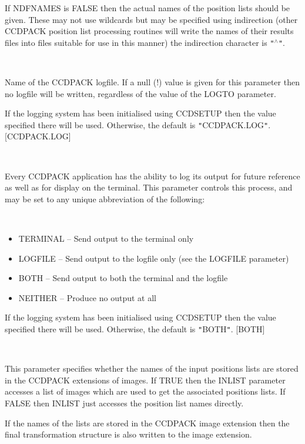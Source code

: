 \documentclass[twoside,11pt]{article}
\newcommand{\htmlref}[2]{#1}
\renewcommand{\_}{\texttt{\symbol{95}}}
\newcommand{\qt}[1]{{\tt "}#1{\tt "}}
\newcommand{\xroutine}[1]{\htmlref{{\sc #1}}{#1}}
\newcommand{\sstsubsection}[1]{ \item[{#1}] \mbox{} \\}
\newcommand{\sstitemlist}[1]{
  \mbox{} \\
  \vspace{-3.5ex}
  \begin{itemize}
     #1
  \end{itemize}
}
\newcommand{\sstitem}{\item}
\newcommand{\sstsubsection}[1]{\item[{#1}]}
\newcommand{\sstitemlist}[1]{
      \begin{itemize}
         #1
      \end{itemize}
      \\
   }
\newcommand{\sstitem}{\item}
\begin{document}
{{{         If NDFNAMES is FALSE then the actual names of the position
         lists should be given. These may not use wildcards but may be
         specified using indirection (other CCDPACK position list
         processing routines will write the names of their results
         files into files suitable for use in this manner) the
         indirection character is \qt{$^\wedge$}.
      }
      \sstsubsection{
         LOGFILE = FILENAME (Read)
      } {
         Name of the CCDPACK logfile.  If a null (!) value is given for
         this parameter then no logfile will be written, regardless of
         the value of the LOGTO parameter.

         If the logging system has been initialised using \xroutine{CCDSETUP}
         then the value specified there will be used. Otherwise, the
         default is \qt{CCDPACK.LOG}.
         [CCDPACK.LOG]
      }
      \sstsubsection{
         LOGTO = LITERAL (Read)
      } {
         Every CCDPACK application has the ability to log its output
         for future reference as well as for display on the terminal.
         This parameter controls this process, and may be set to any
         unique abbreviation of the following:
         \sstitemlist{

            \sstitem
               TERMINAL  -- Send output to the terminal only

            \sstitem
               LOGFILE   -- Send output to the logfile only (see the
                               LOGFILE parameter)

            \sstitem
               BOTH      -- Send output to both the terminal and the
                               logfile

            \sstitem
               NEITHER   -- Produce no output at all

         }
         If the logging system has been initialised using \xroutine{CCDSETUP}
         then the value specified there will be used. Otherwise, the
         default is \qt{BOTH}.
         [BOTH]
      }
      \sstsubsection{
         NDFNAMES = \_LOGICAL (Read)
      } {
         This parameter specifies whether the names of the input
         positions lists are stored in the CCDPACK extensions of images.
         If TRUE then the INLIST parameter accesses a list of images
         which are used to get the associated positions lists. If FALSE
         then INLIST just accesses the position list names directly.

         If the names of the lists are stored in the CCDPACK image
         extension then the final transformation structure is also
         written to the image extension.

}}}
\end{document}
